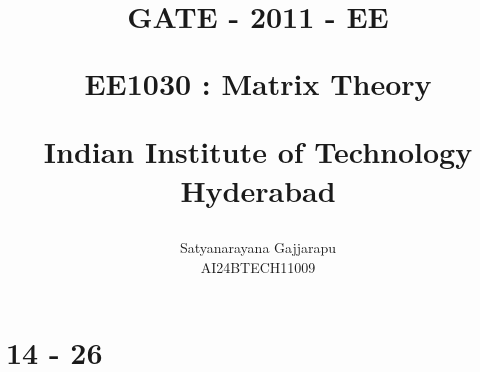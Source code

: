 \documentclass[journal]{IEEEtran}
\begin{document}

\vspace{3cm}




\title{
GATE - 2011 - EE

\large{EE1030 : Matrix Theory}

Indian Institute of Technology Hyderabad
}
\author{Satyanarayana Gajjarapu

AI24BTECH11009
}	





\maketitle




\bigskip

\renewcommand{\thefigure}{\theenumi}
\renewcommand{\thetable}{\theenumi}


\section{14 - 26}
\end{document}
